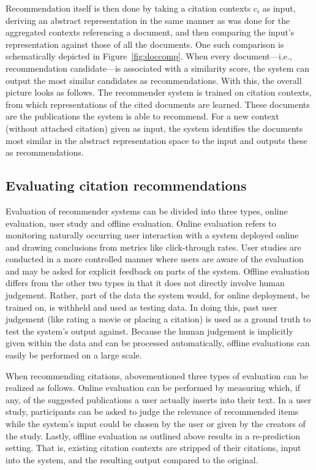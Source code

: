 Recommendation itself is then done by taking a citation contexts $c_i$ as input, deriving an abstract representation in the same manner as was done for the aggregated contexts referencing a document, and then comparing the input's representation against those of all the documents. One such comparison is schematically depicted in Figure~\ref{fig:doccomp}. When every document---i.e., recommendation candidate---is associated with a similarity score, the system can output the most similar candidates as recommendations. With this, the overall picture looks as follows. The recommender system is trained on citation contexts, from which representations of the cited documents are learned. These documents are the publications the system is able to recommend. For a new context (without attached citation) given as input, the system identifies the documents most similar in the abstract representation space to the input and outputs these as recommendations.

\subsection{Evaluating citation recommendations}\label{sec:citreceval}
Evaluation of recommender systems can be divided into three types, online evaluation, user study and offline evaluation. Online evaluation refers to monitoring naturally occurring user interaction with a system deployed online and drawing conclusions from metrics like click-through rates. User studies are conducted in a more controlled manner where users are aware of the evaluation and may be asked for explicit feedback on parts of the system. Offline evaluation differs from the other two types in that it does not directly involve human judgement. Rather, part of the data the system would, for online deployment, be trained on, is withheld and used as testing data. In doing this, past user judgement (like rating a movie or placing a citation) is used as a ground truth to test the system's output against. Because the human judgement is implicitly given within the data and can be processed automatically, offline evaluations can easily be performed on a large scale.~\cite{Aggarwal2016}

When recommending citations, abovementioned three types of evaluation can be realized as follows. Online evaluation can be performed by measuring which, if any, of the suggested publications a user actually inserts into their text. In a user study, participants can be asked to judge the relevance of recommended items while the system's input could be chosen by the user or given by the creators of the study. Lastly, offline evaluation as outlined above results in a re-prediction setting. That is, existing citation contexts are stripped of their citations, input into the system, and the resulting output compared to the original.

